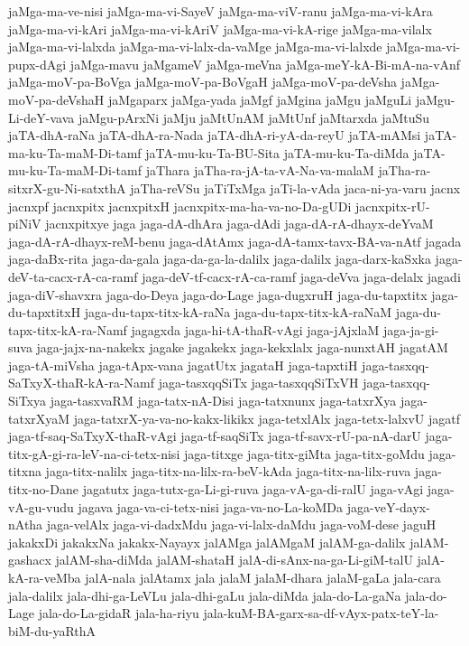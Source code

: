 {jaMga-ma-ve-nisi
jaMga-ma-vi-SayeV
jaMga-ma-viV-ranu
jaMga-ma-vi-kAra
jaMga-ma-vi-kAri
jaMga-ma-vi-kAriV
jaMga-ma-vi-kA-rige
jaMga-ma-vilalx
jaMga-ma-vi-lalxda
jaMga-ma-vi-lalx-da-vaMge
jaMga-ma-vi-lalxde
jaMga-ma-vi-pupx-dAgi
jaMga-mavu
jaMgameV
jaMga-meVna
jaMga-meY-kA-Bi-mA-na-vAnf
jaMga-moV-pa-BoVga
jaMga-moV-pa-BoVgaH
jaMga-moV-pa-deVsha
jaMga-moV-pa-deVshaH
jaMgaparx
jaMga-yada
jaMgf
jaMgina
jaMgu
jaMguLi
jaMgu-Li-deY-vava
jaMgu-pArxNi
jaMju
jaMtUnAM
jaMtUnf
jaMtarxda
jaMtuSu
jaTA-dhA-raNa
jaTA-dhA-ra-Nada
jaTA-dhA-ri-yA-da-reyU
jaTA-mAMsi
jaTA-ma-ku-Ta-maM-Di-tamf
jaTA-mu-ku-Ta-BU-Sita
jaTA-mu-ku-Ta-diMda
jaTA-mu-ku-Ta-maM-Di-tamf
jaThara
jaTha-ra-jA-ta-vA-Na-va-malaM
jaTha-ra-sitxrX-gu-Ni-satxthA
jaTha-reVSu
jaTiTxMga
jaTi-la-vAda
jaca-ni-ya-varu
jacnx
jacnxpf
jacnxpitx
jacnxpitxH
jacnxpitx-ma-ha-va-no-Da-gUDi
jacnxpitx-rU-piNiV
jacnxpitxye
jaga
jaga-dA-dhAra
jaga-dAdi
jaga-dA-rA-dhayx-deYvaM
jaga-dA-rA-dhayx-reM-benu
jaga-dAtAmx
jaga-dA-tamx-tavx-BA-va-nAtf
jagada
jaga-daBx-rita
jaga-da-gala
jaga-da-ga-la-dalilx
jaga-dalilx
jaga-darx-kaSxka
jaga-deV-ta-cacx-rA-ca-ramf
jaga-deV-tf-cacx-rA-ca-ramf
jaga-deVva
jaga-delalx
jagadi
jaga-diV-shavxra
jaga-do-Deya
jaga-do-Lage
jaga-dugxruH
jaga-du-tapxtitx
jaga-du-tapxtitxH
jaga-du-tapx-titx-kA-raNa
jaga-du-tapx-titx-kA-raNaM
jaga-du-tapx-titx-kA-ra-Namf
jagagxda
jaga-hi-tA-thaR-vAgi
jaga-jAjxlaM
jaga-ja-gi-suva
jaga-jajx-na-nakekx
jagake
jagakekx
jaga-kekxlalx
jaga-nunxtAH
jagatAM
jaga-tA-miVsha
jaga-tApx-vana
jagatUtx
jagataH
jaga-tapxtiH
jaga-tasxqq-SaTxyX-thaR-kA-ra-Namf
jaga-tasxqqSiTx
jaga-tasxqqSiTxVH
jaga-tasxqq-SiTxya
jaga-tasxvaRM
jaga-tatx-nA-Disi
jaga-tatxnunx
jaga-tatxrXya
jaga-tatxrXyaM
jaga-tatxrX-ya-va-no-kakx-likikx
jaga-tetxlAlx
jaga-tetx-lalxvU
jagatf
jaga-tf-saq-SaTxyX-thaR-vAgi
jaga-tf-saqSiTx
jaga-tf-savx-rU-pa-nA-darU
jaga-titx-gA-gi-ra-leV-na-ci-tetx-nisi
jaga-titxge
jaga-titx-giMta
jaga-titx-goMdu
jaga-titxna
jaga-titx-nalilx
jaga-titx-na-lilx-ra-beV-kAda
jaga-titx-na-lilx-ruva
jaga-titx-no-Dane
jagatutx
jaga-tutx-ga-Li-gi-ruva
jaga-vA-ga-di-ralU
jaga-vAgi
jaga-vA-gu-vudu
jagava
jaga-va-ci-tetx-nisi
jaga-va-no-La-koMDa
jaga-veY-dayx-nAtha
jaga-velAlx
jaga-vi-dadxMdu
jaga-vi-lalx-daMdu
jaga-voM-dese
jaguH
jakakxDi
jakakxNa
jakakx-Nayayx
jalAMga
jalAMgaM
jalAM-ga-dalilx
jalAM-gashacx
jalAM-sha-diMda
jalAM-shataH
jalA-di-sAnx-na-ga-Li-giM-talU
jalA-kA-ra-veMba
jalA-nala
jalAtamx
jala
jalaM
jalaM-dhara
jalaM-gaLa
jala-cara
jala-dalilx
jala-dhi-ga-LeVLu
jala-dhi-gaLu
jala-diMda
jala-do-La-gaNa
jala-do-Lage
jala-do-La-gidaR
jala-ha-riyu
jala-kuM-BA-garx-sa-df-vAyx-patx-teY-la-biM-du-yaRthA
}
